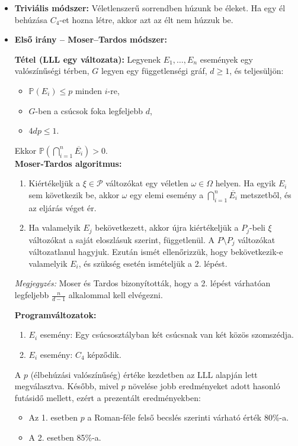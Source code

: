 \documentclass[12pt,a4paper]{article}
\begin{document}
\begin{itemize}
    \item \textbf{Triviális módszer:} Véletlenszerű sorrendben húzunk be éleket. Ha egy él behúzása $C_4$-et hozna létre, akkor azt az élt nem húzzuk be.
    
    \item \textbf{Első irány – Moser–Tardos módszer:} 
    
    \textbf{Tétel (LLL egy változata):} Legyenek $E_1, \dots, E_n$ események egy valószínűségi térben, $G$ legyen egy függetlenségi gráf, $d \geq 1$, és teljesüljön:
    \begin{itemize}
        \item $\mathbb{P}(E_i) \leq p$ minden $i$-re,
        \item $G$-ben a csúcsok foka legfeljebb $d$,
        \item $4dp \leq 1$.
    \end{itemize}
    Ekkor $\mathbb{P}\left( \bigcap_{i=1}^n \overline{E_i} \right) > 0$.
    \\[2mm]
    \textbf{Moser-Tardos algoritmus:}
    \begin{enumerate}
        \item Kiértékeljük a $\xi \in \mathcal{P}$ változókat egy véletlen $\omega \in \Omega$ helyen. Ha egyik $E_i$ sem következik be, akkor $\omega$ egy elemi esemény a $\bigcap_{i=1}^n \overline{E_i}$ metszetből, és az eljárás véget ér.
        \item Ha valamelyik $E_j$ bekövetkezett, akkor újra kiértékeljük a $P_j$-beli $\xi$ változókat a saját eloszlásuk szerint, függetlenül. A $P \setminus P_j$ változókat változatlanul hagyjuk. Ezután ismét ellenőrizzük, hogy bekövetkezik-e valamelyik $E_i$, és szükség esetén ismételjük a 2. lépést.
    \end{enumerate}

    \textit{Megjegyzés:} Moser és Tardos bizonyították, hogy a 2. lépést várhatóan legfeljebb $\frac{n}{d-1}$ alkalommal kell elvégezni.

    \textbf{Programváltozatok:}
    \begin{enumerate}
        \item $E_i$ esemény: Egy csúcsosztályban két csúcsnak van két közös szomszédja.
        \item $E_i$ esemény: $C_4$ képződik.
    \end{enumerate}

    A $p$ (élbehúzási valószínűség) értéke kezdetben az LLL alapján lett megválasztva. Később, mivel $p$ növelése jobb eredményeket adott hasonló futásidő mellett, ezért a prezentált eredményekben:
    \begin{itemize}
        \item Az 1. esetben $p$ a Roman-féle felső becslés szerinti várható érték 80\%-a.
        \item A 2. esetben 85\%-a.
    \end{itemize}
\end{itemize}
\end{document}
